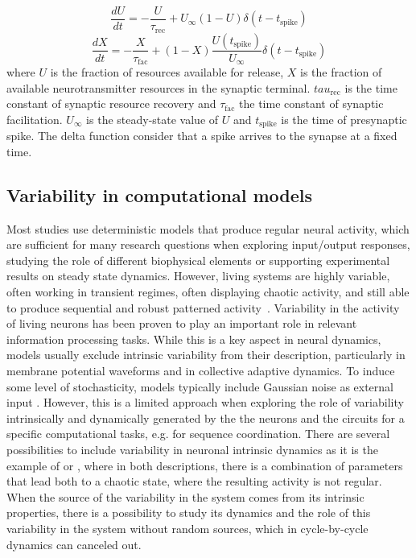 \begin{equation}
	\frac{dU}{dt} = -\frac{U}{\tau_{\text{rec}}} + U_{\infty}(1 - U) \delta(t - t_{\text{spike}})
	\label{eq:tsodyks1}
\end{equation}
\begin{equation}
	\frac{dX}{dt} = -\frac{X}{\tau_{\text{fac}}} + (1 - X) \frac{U(t_{\text{spike}})}{U_{\infty}} \delta(t - t_{\text{spike}})
	\label{eq:tsodyks2}
\end{equation}
\noindent where $U$ is the fraction of resources available for release, $X$ is the fraction of available neurotransmitter resources in the synaptic terminal. $tau_\text{rec}$ is the time constant of synaptic resource recovery and $\tau_\text{fac}$ the time constant of synaptic facilitation. $U_\infty$ is the steady-state value of $U$ and $t_{\text{spike}}$ is the time of presynaptic spike. The delta function consider that a spike arrives to the synapse at a fixed time. 

\subsection{Variability in computational models}

Most studies use deterministic models that produce regular neural activity, which are sufficient for many research questions when exploring input/output responses, studying the role of different biophysical elements or supporting experimental results on steady state dynamics. However, living systems are highly variable, often working in transient regimes, often displaying chaotic activity, and still able to produce sequential and robust patterned activity~\parencite{selverston_reliable_2000}. Variability in the activity of living neurons has been proven to play an important role in relevant information processing tasks\parencite{ding_phd_dynamic_2011,renart_variability_2014,masquelier_neural_2013,hutt_intrinsic_2023,ribeiro_trial-by-trial_2024}. While this is a key aspect in neural dynamics, models usually exclude intrinsic variability from their description,  particularly in membrane potential waveforms and in collective adaptive dynamics. To induce some level of stochasticity, models typically include Gaussian noise as external input \parencite{linaro_accurate_2011,pezo_diffusion_2014,zheng_spontaneous_2020}. However, this is a limited approach when exploring the role of variability intrinsically and dynamically generated by the the neurons and the circuits for a specific computational tasks, e.g. for sequence coordination. There are several possibilities to include variability in neuronal intrinsic dynamics as it is the example of \cite{hindmarsh_model_1984} or \cite{komendantov_deterministic_1996}, where in both descriptions, there is a combination of parameters that lead both to a chaotic state, where the resulting activity is not regular. When the source of the variability in the system comes from its intrinsic properties, there is a possibility to study its dynamics and the role of this variability in the system without random sources, which in cycle-by-cycle dynamics can canceled out.

